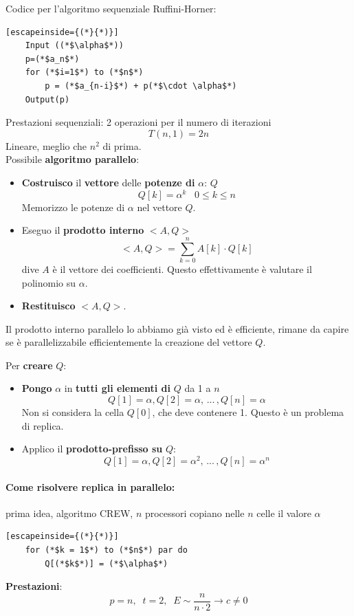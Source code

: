 \documentclass[11pt]{article}
\begin{document}
	Codice per l'algoritmo sequenziale Ruffini-Horner:
	\begin{lstlisting}[escapeinside={(*}{*)}]
	Input ((*$\alpha$*))
	p=(*$a_n$*)
	for (*$i=1$*) to (*$n$*)
		p = (*$a_{n-i}$*) + p(*$\cdot \alpha$*)
	Output(p)
	\end{lstlisting}
	
	Prestazioni sequenziali: 2 operazioni per il numero di iterazioni
	$$ T(n, 1) = 2n $$
	Lineare, meglio che $n^2$ di prima.\\
	
	Possibile \textbf{algoritmo parallelo}:
	\begin{itemize}
		\item \textbf{Costruisco} il \textbf{vettore} delle \textbf{potenze di} $\alpha$: $Q$
		$$ Q[k] = \alpha^k \;\;\; 0 \leq k \leq n $$
		Memorizzo le potenze di $\alpha$ nel vettore $Q$. \\
		
		\item Eseguo il \textbf{prodotto interno} $<A,Q>$
		$$ <A, Q> = \sum_{k=0}^n A[k] \cdot Q[k] $$
		dive $A$ è il vettore dei coefficienti. Questo effettivamente è valutare il polinomio su $\alpha$. \\
		
		\item \textbf{Restituisco} $<A, Q>$. \\
	\end{itemize}
	
	Il prodotto interno parallelo lo abbiamo già visto ed è efficiente, rimane da capire se è parallelizzabile efficientemente la creazione del vettore $Q$.\\
	
	\newpage
	
	Per \textbf{creare} $Q$:
	\begin{itemize}
		\item \textbf{Pongo} $\alpha$ in \textbf{tutti gli elementi di} $Q$ da 1 a $n$
		$$ Q[1] = \alpha, Q[2] = \alpha, \, ... \, , Q[n] = \alpha $$
		Non si considera la cella $Q[0]$, che deve contenere 1. Questo è un problema di replica.\\
		
		\item Applico il \textbf{prodotto-prefisso su} $Q$: 
		$$ Q[1]= \alpha, Q[2] = \alpha^2 , \, ... \, , Q[n] = \alpha^n $$
	\end{itemize}
	
	
	
	\paragraph{Come risolvere replica in parallelo:} prima idea, algoritmo CREW, $n$ processori copiano nelle $n$ celle il valore $\alpha$
	\begin{lstlisting}[escapeinside={(*}{*)}]
	for (*$k = 1$*) to (*$n$*) par do
		Q[(*$k$*)] = (*$\alpha$*)
	\end{lstlisting}
	\textbf{Prestazioni}: 
	$$ p = n, \;\; t = 2, \;\; E \sim \frac{n}{n \cdot 2} \rightarrow c \neq 0 $$
	
\end{document}

